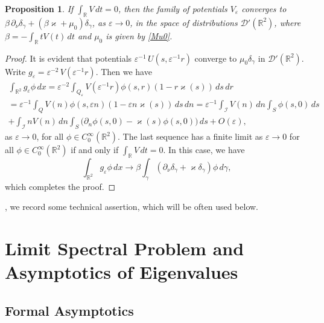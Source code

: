 \documentclass[reqno]{amsart}
\theoremstyle{plain}
\newtheorem{prop}{Proposition}
\numberwithin{equation}{section}
\renewcommand{\kappa}{\varkappa}
\newcommand{\Real}{\mathbb R}
\newcommand{\eps}{\varepsilon}
\newcommand{\cI}{\mathcal{I}}
\newcommand{\rd}[1]{{\color{red}{#1}}}
\begin{document}
\begin{prop}\label{PropVepsConverg}
If $\int_\Real V\,dt=0$, then the family of potentials $V_\eps$ converges
to $\beta\,\partial_\nu\delta_\gamma+\left(\beta\kappa+\mu_0\right) \delta_\gamma$, as $\eps\to 0$, in the space of distributions $\mathcal{D}'(\Real^2)$, where
$\beta=-\int_\Real t V(t)\,dt$ and $\mu_0$ is given by \eqref{Mu0}.
\end{prop}
\begin{proof}
It is evident that potentials $\eps^{-1}\,U\left(s,\eps^{-1}r\right)$
converge to $\mu_0 \delta_\gamma$ in $\mathcal{D}'(\Real^2)$.
Write $g_\eps=\eps^{-2}\,V\left(\eps^{-1}r\right)$. Then we have
\begin{multline*}
\int_{\Real^2}g_\eps\phi\,dx
=
\eps^{-2}\int_{Q_\eps} V(\eps^{-1}r)\phi(s,r)(1-r\kappa(s))\,ds\,dr
\\
 =
\eps^{-1}\int_{Q} V(n)\phi(s,\eps n)(1-\eps n\kappa(s))\,ds\,dn
=\eps^{-1}\int_{\cI} V(n)\,dn \int_S\phi(s,0)\,ds
\\
+
\int_{\cI} n V(n)\,dn \int_S\big(\partial_n\phi(s,0)-\kappa(s)\phi(s,0)\big)\,ds+O(\eps),
\end{multline*}
as $\eps\to 0$,  for all $\phi\in C^\infty_0(\Real^2)$.
The last sequence  has a finite limit as $\eps\to 0$ for all $\phi\in C^\infty_0(\Real^2)$ if and only if $\int_\Real V\,dt=0$.
In this case, we have
\begin{equation*}
\int_{\Real^2}g_\eps\phi\,dx\to \beta\int_\gamma\left(\partial_\nu\delta_\gamma+\kappa \delta_\gamma\right)\phi\,d\gamma,
\end{equation*}
which completes the proof.
\end{proof}

\rd{At the end of the section},  we record some technical assertion, which  will be often used below.



\section{Limit Spectral Problem and Asymptotics of Eigenvalues}\label{Sec:LimitOperator}

\subsection{Formal Asymptotics}
\end{document}
